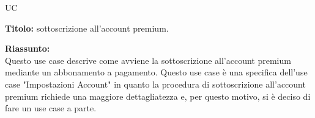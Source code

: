 \begin{listaPersonale}{UC}
    \begin{listaPersonale2}[UC] {}
        \newpage

        \begin{center}
            
        \end{center}


        \textbf{Titolo:} sottoscrizione all'account premium.

        \textbf{Riassunto:} \\
        Questo use case descrive come avviene la sottoscrizione all'account premium mediante un abbonamento a pagamento.
        Questo use case è una specifica dell'use case "Impostazioni Account" in quanto la procedura di sottoscrizione all'account premium richiede una maggiore dettagliatezza e, per questo motivo, si è deciso di fare un use case a parte.


\end{listaPersonale2}
\end{listaPersonale}
